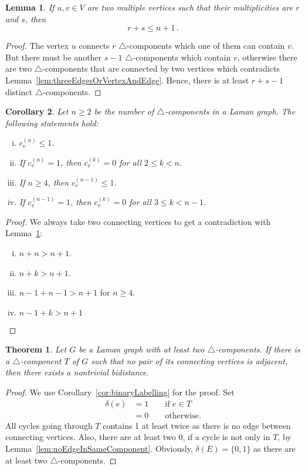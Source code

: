 \documentclass[a4paper, 11pt]{article}
\newcommand{\trcomp}{$\triangle$-component}
\newcommand{\trcomps}{$\triangle$-components}
\newcommand{\cv}[1]{c_v^{(#1)}}
\newtheorem{thm}{Theorem}[section]
\newtheorem{lem}{Lemma}[section]
\newtheorem{cor}[lem]{Corollary}
\theoremstyle{definition}
\begin{document}
\begin{lem}
\label{lem:twoConnectingVertices}
If $u,v\in V$ are two multiple vertices such that their multiplicities are $r$ and $s$, then
$$
r+s\leq n+1\,.
$$
\end{lem}
\begin{proof}
The vertex $u$ connects $r$ \trcomps{} which one of them can contain $v$. But there must be another $s-1$ \trcomps{} which contain $v$, otherwise there are two \trcomps{} that are connected by two vertices which contradicts Lemma~\ref{lem:threeEdgesOrVertexAndEdge}. Hence, there is at least $r+s-1$ distinct \trcomps{}.
\end{proof}

\begin{cor}
Let $n\geq 2$ be the number of \trcomps{} in a Laman graph. The following statements hold:
\begin{enumerate}[i)]
	\item $\cv{n} \leq 1$.
	\item If $\cv{n} = 1$, then $\cv{k}=0$ for all $2\leq k<n$.
	\item If $n\geq 4$, then $\cv{n-1} \leq 1$.
	\item If $\cv{n-1} = 1$, then $\cv{k}=0$ for all $3\leq k<n-1$.
\end{enumerate}
\end{cor}
\begin{proof}
We always take two connecting vertices to get a contradiction with Lemma~\ref{lem:twoConnectingVertices}:
\begin{enumerate}[i)]
	\item $n+n >n +1$.
	\item $n +k>n+1$.
	\item $n-1+n-1>n+1$ for $n\geq 4$.
	\item $n-1+k>n+1$
\end{enumerate}
\end{proof}

\begin{thm}
\label{thm:componentWithNonadjacentVertices}
Let $G$ be a Laman graph with at least two \trcomps{}. If there is a \trcomp{} $T$ of $G$ such that no pair of its connecting vertices is adjacent, then there exists a nontrivial bidistance.
\end{thm}
\begin{proof}
We use Corollary~\ref{cor:binaryLabelling} for the proof. Set 
\begin{align*}
\delta(e)&=1 \qquad \text{if } e\in T \\
		&=0 \qquad \text{otherwise.}
\end{align*} 
All cycles going through $T$ contains 1 at least twice as there is no edge between connecting vertices. Also, there are at least two 0, if a cycle is not only in $T$, by Lemma~\ref{lem:noEdgeInSameComponent}. Obviously, $\delta(E)=\{0,1\}$ as there are at least two \trcomps{}.
\end{proof}
\end{document}
